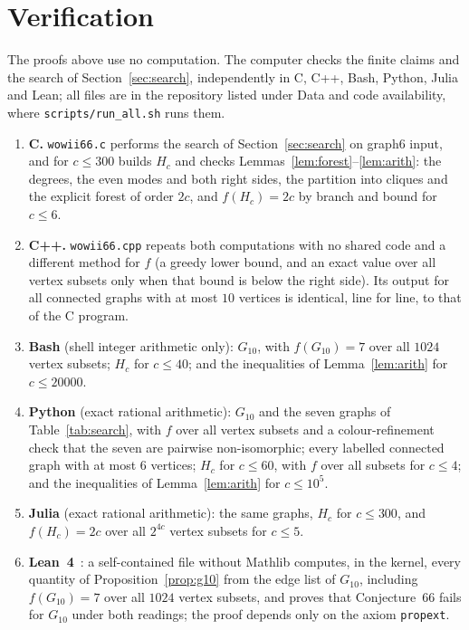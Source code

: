 \documentclass[10pt,a4paper]{article}
\begin{document}
\appendix

\section{Verification}\label{app:verification}

The proofs above use no computation. The computer checks the finite claims and the search of Section~\ref{sec:search}, independently in C, C++, Bash, Python, Julia and Lean; all files are in the repository listed under Data and code availability, where \texttt{scripts/run\_all.sh} runs them.
\begin{enumerate}
\item \textbf{C.} \texttt{wowii66.c} performs the search of Section~\ref{sec:search} on graph6 input, and for $c\le300$ builds $H_c$ and checks Lemmas~\ref{lem:forest}--\ref{lem:arith}: the degrees, the even modes and both right sides, the partition into cliques and the explicit forest of order $2c$, and $f(H_c)=2c$ by branch and bound for $c\le6$.
\item \textbf{C++.} \texttt{wowii66.cpp} repeats both computations with no shared code and a different method for $f$ (a greedy lower bound, and an exact value over all vertex subsets only when that bound is below the right side). Its output for all connected graphs with at most $10$ vertices is identical, line for line, to that of the C program.
\item \textbf{Bash} (shell integer arithmetic only): $G_{10}$, with $f(G_{10})=7$ over all $1024$ vertex subsets; $H_c$ for $c\le40$; and the inequalities of Lemma~\ref{lem:arith} for $c\le20000$.
\item \textbf{Python} (exact rational arithmetic): $G_{10}$ and the seven graphs of Table~\ref{tab:search}, with $f$ over all vertex subsets and a colour-refinement check that the seven are pairwise non-isomorphic; every labelled connected graph with at most $6$ vertices; $H_c$ for $c\le60$, with $f$ over all subsets for $c\le4$; and the inequalities of Lemma~\ref{lem:arith} for $c\le10^5$.
\item \textbf{Julia} (exact rational arithmetic): the same graphs, $H_c$ for $c\le300$, and $f(H_c)=2c$ over all $2^{4c}$ vertex subsets for $c\le5$.
\item \textbf{Lean~4}~\cite{MouraUllrich2021}: a self-contained file without Mathlib computes, in the kernel, every quantity of Proposition~\ref{prop:g10} from the edge list of $G_{10}$, including $f(G_{10})=7$ over all $1024$ vertex subsets, and proves that Conjecture~66 fails for $G_{10}$ under both readings; the proof depends only on the axiom \texttt{propext}.

\end{enumerate}
\end{document}
